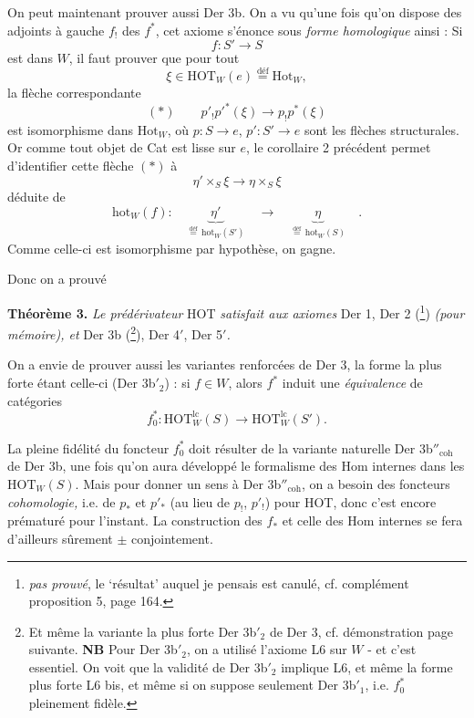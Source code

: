 \documentclass[11pt]{article}
\newcommand{\msp}[1]{\marginpar{\footnotesize [#1]}}
\newcommand{\HOT}{\mathrm{HOT}}
\newcommand{\hot}{\mathrm{hot}}
\begin{document}
On peut maintenant prouver aussi Der 3b. On a vu qu'une fois qu'on dispose des adjoints à gauche $f_!$ des $f^*$, cet axiome s'énonce sous \textit{forme homologique} ainsi : Si
\[f : S'\longrightarrow S\]
est dans $W$, il faut prouver que pour tout
\[\xi\in\HOT_W(e)\overset{\text{déf}}{=}\mathrm{Hot}_W,\]
la flèche correspondante
\[(*)\qquad p'_!p'^*(\xi)\longrightarrow p_!p^*(\xi)\]
est isomorphisme dans $\mathrm{Hot}_W$, où $p : S\longrightarrow e$, $p' : S'\longrightarrow e$ sont les flèches structurales. Or comme tout objet de Cat est lisse sur $e$, le corollaire 2 précédent permet d'identifier cette flèche $(*)$ à
\[\eta'\times_S\xi\longrightarrow\eta\times_S\xi\]
\msp{159}
déduite de
\[\hot_W(f) :\quad\underbrace{\ \eta'\ }_{\overset{\text{déf}}{=}\,\hot_W(S')}\quad\longrightarrow\quad\underbrace{\ \eta\ }_{\overset{\text{déf}}{=}\,\hot_W(S)}\quad.\]
Comme celle-ci est isomorphisme par hypothèse, on gagne.

Donc on a prouvé

\textbf{Théorème 3.} \textit{Le prédérivateur} HOT \textit{satisfait aux axiomes} Der 1, Der 2 (\footnote[76]{\textit{pas prouvé}, le ‘résultat’ auquel je pensais est canulé, cf. complément proposition 5, page 164.}) \textit{(pour mémoire), et} Der 3b (\footnote[77]{Et même la variante la plus forte Der 3b$'_2$ de Der 3, cf. démonstration page suivante. \textbf{NB} Pour Der 3b$'_2$, on a utilisé l'axiome L6 sur $W$ - et c'est essentiel. On voit que la validité de Der 3b$'_2$ implique L6, et même la forme plus forte L6 bis, et même si on suppose seulement Der 3b$'_1$, i.e. $f_0^*$ pleinement fidèle.}), Der 4$'$, Der 5$'$\textit{.} %

On a envie de prouver aussi les variantes renforcées de Der 3, la forme la plus forte étant celle-ci (Der 3b$'_2$) : si $f\in W$, alors $f^*$ induit une \textit{équivalence} de catégories
\[f_0^* : \HOT^{\mathrm{lc}}_W(S)\longrightarrow\HOT^{\mathrm{lc}}_W(S').\]

La pleine fidélité du foncteur $f_0^*$ doit résulter de la variante naturelle Der 3b$''_{\mathrm{coh}}$ de Der 3b, une fois qu'on aura développé le formalisme des Hom internes dans les $\HOT_W(S)$. Mais pour donner un sens à Der 3b$''_{\mathrm{coh}}$, on a besoin des foncteurs \textit{cohomologie,} i.e. de $p_*$ et $p'_*$ (au lieu de $p_!$, $p'_!$) pour HOT, donc c'est encore prématuré pour l'instant. La construction des $f_*$ et celle des Hom internes se fera d'ailleurs sûrement $\pm$ conjointement.
\end{document}
